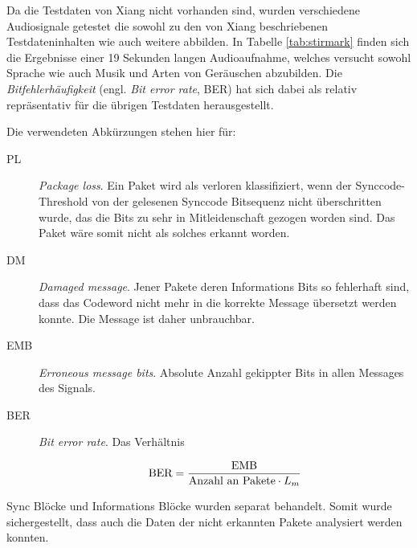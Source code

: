 Da die Testdaten von Xiang nicht vorhanden sind, wurden verschiedene Audiosignale getestet die sowohl zu den von Xiang beschriebenen Testdateninhalten wie auch weitere abbilden. In Tabelle \ref{tab:stirmark} finden sich die Ergebnisse einer 19 Sekunden langen Audioaufnahme, welches versucht sowohl Sprache wie auch Musik und Arten von Geräuschen abzubilden. Die \textit{Bitfehlerhäufigkeit} (engl. \textit{Bit error rate},  BER) hat sich dabei als relativ repräsentativ für die übrigen Testdaten herausgestellt. 

Die verwendeten Abkürzungen stehen hier für:

\begin{description}
	
\item[PL] \textit{Package loss}. Ein Paket wird als verloren klassifiziert, wenn der Synccode-Threshold von der gelesenen Synccode Bitsequenz nicht überschritten wurde, das die Bits zu sehr in Mitleidenschaft gezogen worden sind. Das Paket wäre somit nicht als solches erkannt worden. 

\item[DM] \textit{Damaged message}. Jener Pakete deren Informations Bits so fehlerhaft sind, dass das Codeword nicht mehr in die korrekte Message übersetzt werden konnte. Die Message ist daher unbrauchbar.

\item[EMB] \textit{Erroneous message bits}. Absolute Anzahl gekippter Bits in allen Messages des Signals. 

\item[BER] \textit{Bit error rate}. Das Verhältnis 

	\begin{equation}
		\mbox{BER} = {\mbox{EMB} \over \mbox{Anzahl an Pakete} \cdot {L}_{m}}
		\label{equ:ber}
	\end{equation}
\end{description}

Sync Blöcke  und Informations Blöcke wurden separat behandelt. Somit wurde sichergestellt, dass auch die Daten der nicht erkannten Pakete analysiert werden konnten.  

